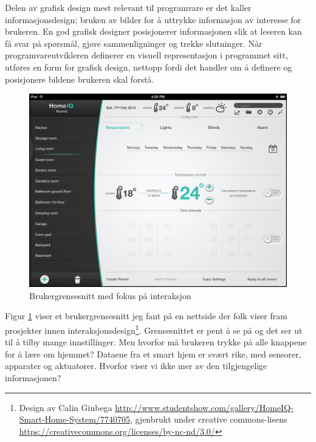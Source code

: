 Delen av grafisk design mest relevant til programvare er det \citet{tufte01} kaller informasjonsdesign; bruken av bilder for å uttrykke informasjon av interesse for brukeren. En god grafisk designer posisjonerer informasjonen slik at leseren kan få svar på spørsmål, gjøre sammenligninger og trekke slutninger. Når programvareutvikleren definerer en visuell representasjon i programmet sitt, utføres en form for grafisk design, nettopp fordi det handler om å definere og posisjonere bildene brukeren skal forstå.
\begin{figure}
\centering
\includegraphics[scale=1.0]{fig/typical_ui_homeiq}
\caption{Brukergrensesnitt med fokus på interaksjon}
\label{fig:homeiq}
\end{figure}
Figur \ref{fig:homeiq} viser et brukergrensesnitt jeg fant på en nettside der folk viser fram prosjekter innen interaksjonsdesign\footnote{Design av Calin Giubega \url{http://www.studentshow.com/gallery/HomeIQ-Smart-Home-System/7740705}, gjenbrukt under creative commons-lisens \url{https://creativecommons.org/licenses/by-nc-nd/3.0/}}. Grensesnittet er pent å se på og det ser ut til å tilby mange innstillinger. Men hvorfor må brukeren trykke på alle knappene for å lære om hjemmet? Dataene fra et smart hjem er svært rike, med sensorer, apparater og aktuatorer. Hvorfor viser vi ikke mer av den tilgjengelige informasjonen?

